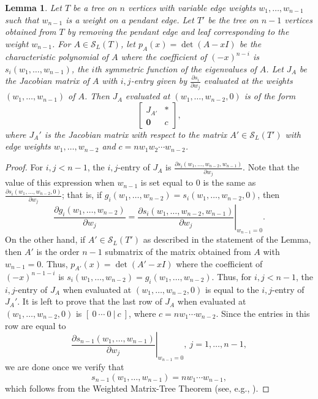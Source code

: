 \documentclass{article}
\newtheorem{lemma}[theorem]{Lemma}
\theoremstyle{definition}
\newcommand{\mptn}{\mathcal{S}}
\begin{document}
\begin{lemma}
\label{lem:Jac_submatrix}
Let $T$ be a  tree on $n$ vertices with variable edge weights $w_1, \dots, w_{n-1}$ such that $w_{n-1}$ is a weight on a pendant edge. Let $T'$ be the tree on $n-1$ vertices  obtained from $T$ by removing the pendant edge and leaf corresponding to the weight $w_{n-1}$. For $A \in \mptn_L(T)$, let
$p_A(x) = \det(A- xI)$ be the characteristic polynomial of $A$ where the coefficient of $(-x)^{n-i}$ is  $s_i(w_1, \dots, w_{n-1})$, the $i$th symmetric function of the eigenvalues of $A$. Let $J_A$ be the Jacobian matrix of $A$ with $i,j$-entry given by $\frac{\partial s_i}{\partial w_j}$ evaluated at the weights $(w_1, \dots, w_{n-1})$ of $A$. Then $J_A$ evaluated at $(w_1, \dots, w_{n-2}, 0)$
is of the form 
\[
\left[\begin{array}{c|c}
J_{A'} & \ast \\ \hline
\mathbf{0} & c
\end{array}
\right],
\]
where $J_A'$ is the Jacobian matrix with respect to the matrix $A' \in \mptn_L(T')$ with edge weights $w_1, \dots, w_{n-2}$ and $c =  nw_1 w_2  \cdots w_{n-2}$.
\end{lemma}
\begin{proof}
For $i, j < n-1$, the $i,j$-entry of $J_A$ is $\frac{\partial s_i(w_1, \dots, w_{n-2}, w_{n-1})}{\partial w_j}$. Note that the value of this expression when $w_{n-1}$ is set equal to 0 is the same as $\frac{\partial s_i(w_1, \dots, w_{n-2}, 0)}{\partial w_j}$; that is, if $g_i(w_1, \dots, w_{n-2}) = s_i(w_1, \dots, w_{n-2}, 0)$, then  $$\frac{\partial g_i(w_1, \dots, w_{n-2})}{\partial w_j} = \left. \frac{\partial s_i(w_1, \dots, w_{n-2}, w_{n-1})}{\partial w_j} \right |_{w_{n-1}= 0}.$$
On the other hand, if $A' \in \mptn_L(T')$ as described in the statement of the Lemma, then $A'$ is the order $n-1$ submatrix of the matrix obtained from $A$ with $w_{n-1} = 0$. Thus, $p_{A'}(x) = \det(A' - xI)$ where the coefficient of $(-x)^{n-1-i}$ is 
$s_i(w_1, \dots, w_{n-2}) = g_i(w_1, \dots, w_{n-2})$. Thus, for $i, j < n-1$, the $i,j$-entry of $J_A$ when evaluated at $(w_1, \dots, w_{n-2}, 0)$ is equal to the $i,j$-entry of $J_A'$. It is left to prove that the last row of $J_A$ when evaluated at $(w_1, \dots, w_{n-2}, 0)$ is $[\ 0 \ \cdots \  0 \ | \ c \ ]$, where $c=nw_1 \cdots w_{n-2}$.  Since the entries in this row are equal to $$\left.\frac{\partial s_{n-1}(w_1, \dots, w_{n-1})}{\partial w_j}\right |_{w_{n-1}= 0}, \ j = 1, \dots, n-1,$$ we are done once we verify that 
\begin{equation}
\label{eq:sn-1}
s_{n-1}(w_1, \dots, w_{n-1}) = nw_1\cdots w_{n-1},
\end{equation}
which follows from the Weighted Matrix-Tree Theorem (see, e.g., \cite{KS}).
\end{proof}
\end{document}
